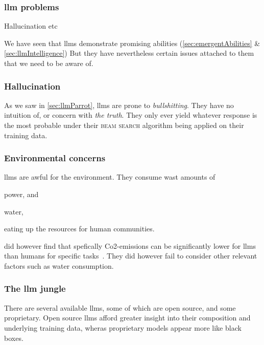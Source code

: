 \subsubsection{\acrshort{llm} problems}\label{sec:llmProblems}

Hallucination etc

We have seen that \acrshort{llms} demonstrate promising abilities
(\cref{sec:emergentAbilities} \& \cref{sec:llmIntelligence}) But they have nevertheless
certain issues attached to them that we need to be aware of.

\subsubsection*{Hallucination}

As we saw in \cref{sec:llmParrot}, \acrshort{llms} are prone to
\textit{bullshitting}. They have no intuition of, or concern with \textit{the
    truth}. They only ever yield whatever response is the most probable under their
\textsc{beam search} algorithm being applied on their training data.

\subsubsection*{Environmental concerns}

\acrshort{llms} are awful for the environment. They consume wast amounts of \begin{inparaenum}
    \item power,
    and
    \item water,
\end{inparaenum}
eating up the resources for human communities.

\citeauthor{llmCarbon} did however find that spefically Co2-emissions can be
significantly lower for \acrshort{llms} than humans for specific
tasks~\cite{llmCarbon}. They did however fail to consider other relevant factors such
as water consumption.


\subsubsection{The \acrshort{llm} jungle}

There are several available \acrshort{llms}, some of which are open source, and some proprietary.
Open source \acrshort{llms} afford greater insight into their composition and underlying training
data, wheras proprietary models appear more like black boxes.

